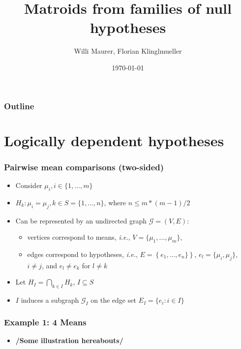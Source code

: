 \documentclass[bigger]{beamer}
\title{Matroids from families of null hypotheses}
\author{Willi Maurer, Florian Klinglmueller}
\date{\today}
\begin{document}
\maketitle



\begin{frame}
\frametitle{Outline}
\setcounter{tocdepth}{3}
\tableofcontents
\end{frame}




\section{Logically dependent hypotheses}


\begin{frame}
\frametitle{Pairwise mean comparisons (two-sided)}
\begin{itemize}

\item Consider $\mu_i, i \in \{1,...,m\}$

\item $H_k: \mu_i = \mu_j, k \in S = \{1,...,n\}$, where $n \leq m*(m-1)/2$

\item Can be represented by an undirected graph $\mathscr{G} = (V,E)$:
\begin{itemize}
\item vertices correspond to means, \emph{i.e.}, $V = \{\mu_1,...,\mu_m\}$,
\item edges correspond to hypotheses, \emph{i.e.}, $E =
      \left\{e_1,...,e_n\} \right\}$, $e_l = \{\mu_i,\mu_j\}$, $i \neq
      j$, and $e_l \neq e_k$ for $l \neq k$
\end{itemize}
\item Let $H_I = \bigcap_{k \in I} H_k$, $I \subseteq S$
\item $I$ induces a subgraph $\mathscr{G}_I$ on the edge set $E_I=\{e_i: i
  \in I\}$
\end{itemize} %
\end{frame}






\begin{frame}
\frametitle{Example 1: 4 Means}
\begin{itemize}

\item \textbf{/Some illustration hereabouts/}

\end{itemize} %
\end{frame}
\end{document}
